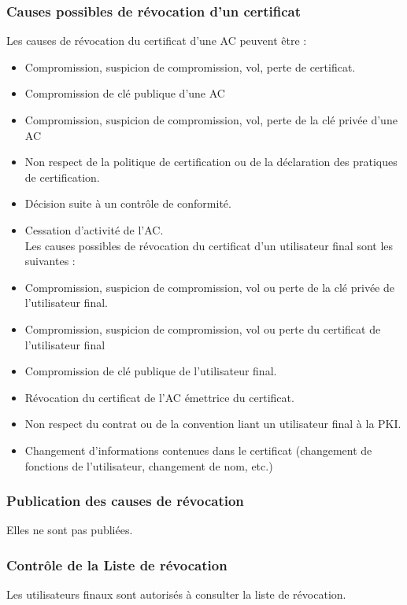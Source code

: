\documentclass[a4paper,11pt,french]{article}
\begin{document}
\subsubsection{Causes possibles de révocation d'un certificat}

Les causes de révocation du certificat d'une AC peuvent être :
\begin{itemize}
\item Compromission, suspicion de compromission, vol, perte de certificat.
\item Compromission de clé publique d’une AC
\item Compromission, suspicion de compromission, vol, perte de la clé privée d’une AC
\item Non respect de la politique de certification ou de la déclaration des pratiques de certification.
\item Décision suite à un contrôle de conformité.
\item Cessation d’activité de l’AC.
\\

Les causes possibles de révocation du certificat d’un utilisateur final sont les suivantes :
\item Compromission, suspicion de compromission, vol ou perte de la clé privée de l’utilisateur final.
\item Compromission, suspicion de compromission, vol ou perte du certificat de l’utilisateur final
\item Compromission de clé publique de l’utilisateur final.
\item Révocation du certificat de l’AC émettrice du certificat.
\item Non respect du contrat ou de la convention liant un utilisateur final à la PKI.
\item Changement d’informations contenues dans le certificat (changement de fonctions de l’utilisateur, changement de nom, etc.)

\end{itemize}

\subsubsection{Publication des causes de révocation}
Elles ne sont pas publiées.

\subsubsection{Contrôle de la Liste de révocation}
Les utilisateurs finaux sont autorisés à consulter la liste de révocation.
\end{document}
